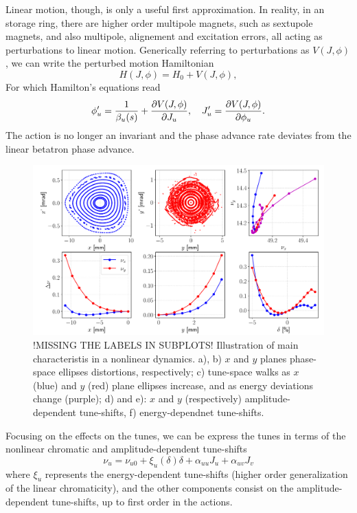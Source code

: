 Linear motion, though, is only a useful first approximation. In reality, in an storage ring, there are higher order multipole magnets, such as sextupole magnets, and also multipole, alignement and excitation errors, all acting as perturbations to linear motion. Generically referring to perturbations as $V(J, \phi)$, we can write the perturbed motion Hamiltonian
\begin{equation}
    H(J,\phi) =H_0 + V(J,\phi),
\end{equation}
For which Hamilton's equations read
\begin{equation}
\phi_u^\prime = \frac{1}{\beta_u(s)}+\pdv{V(J,\phi)}{J_u}, \quad J_u^\prime = \pdv{V(J,\phi)}{\phi_u}.
\end{equation}
The action is no longer an invariant and the phase advance rate deviates from the linear betatron phase advance.
\begin{figure}
    \centering
    \includegraphics[width=\textwidth]{Images/nonlinear_dynamics_phase_tunes.pdf}
    \caption{!MISSING THE LABELS IN SUBPLOTS! Illustration of main characteristis in a nonlinear dynamics. a), b) $x$ and $y$ planes phase-space ellipses distortions, respectively; c) tune-space walks as $x$ (blue) and $y$ (red) plane ellipses increase, and as energy deviations change (purple); d) and e): $x$ and $y$ (respectively) amplitude-dependent tune-shifts, f) energy-dependnet tune-shifts.}
\end{figure}

Focusing on the effects on the tunes, we can be express the tunes in terms of the nonlinear chromatic and amplitude-dependent tune-shifts
\begin{equation}
    \nu_u = \nu_{u0} + \xi_u(\delta) \delta + \alpha_{uu} J_u + \alpha_{uv} J_v
\end{equation}
where $\xi_u$ represents the energy-dependent tune-shifts (higher order generalization of the linear chromaticity), and the other components consist on the amplitude-dependent tune-shifts, up to first order in the actions.


